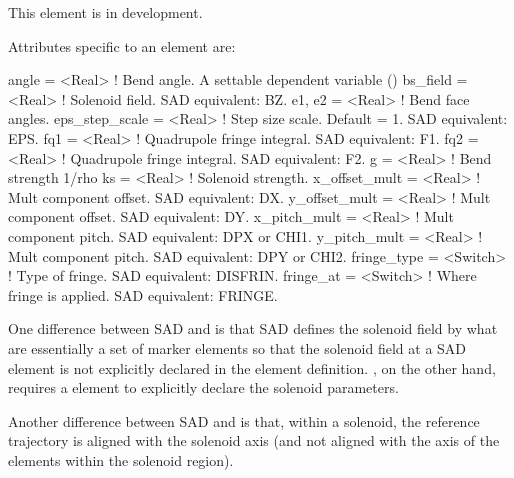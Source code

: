 {This element is in development.

Attributes specific to an  element are:
\begin{example}
  angle           = <Real>    ! Bend angle. A settable dependent variable ()
  bs_field        = <Real>    ! Solenoid field. SAD equivalent: BZ.
  e1, e2          = <Real>    ! Bend face angles.
  eps_step_scale  = <Real>    ! Step size scale. Default = 1. SAD equivalent: EPS.
  fq1             = <Real>    ! Quadrupole fringe integral. SAD equivalent: F1.
  fq2             = <Real>    ! Quadrupole fringe integral. SAD equivalent: F2.
  g               = <Real>    ! Bend strength 1/rho
  ks              = <Real>    ! Solenoid strength. 
  x_offset_mult   = <Real>    ! Mult component offset. SAD equivalent: DX.
  y_offset_mult   = <Real>    ! Mult component offset. SAD equivalent: DY.
  x_pitch_mult    = <Real>    ! Mult component pitch. SAD equivalent: DPX or CHI1.
  y_pitch_mult    = <Real>    ! Mult component pitch. SAD equivalent: DPY or CHI2.
  fringe_type     = <Switch>  ! Type of fringe. SAD equivalent: DISFRIN.
  fringe_at       = <Switch>  ! Where fringe is applied. SAD equivalent: FRINGE.
\end{example}


One difference between SAD and \bmad is that SAD defines the solenoid
field by what are essentially a set of marker elements so that the
solenoid field at a SAD  element is not explicitly declared
in the  element definition. \bmad, on the other hand,
requires a  element to explicitly declare the solenoid
parameters.

Another difference between SAD and \bmad is that, within a solenoid,
the reference trajectory is aligned with the solenoid axis (and not
aligned with the axis of the elements within the solenoid region).

}
